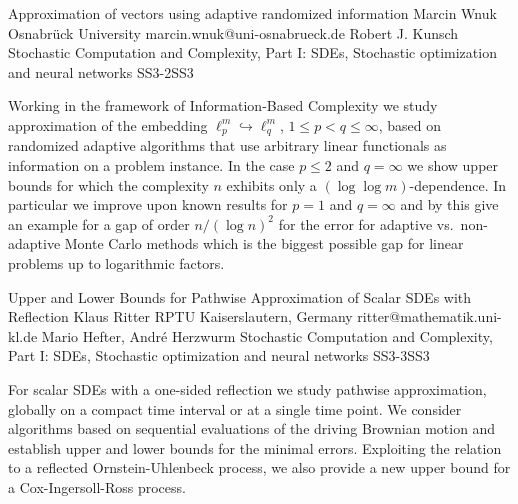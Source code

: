 \begin{talk}
{Approximation of vectors using adaptive randomized information}
{Marcin Wnuk}
{Osnabr\"uck University}
{marcin.wnuk@uni-osnabrueck.de}
{Robert J. Kunsch}
{Stochastic Computation and Complexity, Part I: SDEs, Stochastic optimization and neural networks}
{}{SS3-2}{SS3}



Working in the framework of Information-Based Complexity we study approximation of the embedding $\ell_p^m \hookrightarrow \ell_q^m$, $1 \leq p < q \leq \infty$,
based on randomized adaptive algorithms that use arbitrary linear 
functionals as information on a problem instance.
In the case $p \leq 2$ and $q = \infty$
we show upper bounds for which the complexity $n$ 
exhibits only a $(\log\log m)$-dependence. 
In particular we improve upon known results for $p=1$ and $q=\infty$
and by this give an example for a gap of order $n / (\log n)^2$
for the error for adaptive vs.\ non-adaptive Monte Carlo methods
which is the biggest possible gap for linear problems up to logarithmic factors.

\end{talk}

\begin{talk}
  {Upper and Lower Bounds for Pathwise Approximation of Scalar SDEs with Reflection}%
  {Klaus Ritter}%
  {RPTU Kaiserslautern, Germany}%
  {ritter@mathematik.uni-kl.de}%
  {Mario Hefter, Andr\'e Herzwurm}%
{Stochastic Computation and Complexity, Part I: SDEs, Stochastic optimization and neural networks}
{}{SS3-3}{SS3}


				
For scalar SDEs with a one-sided reflection we study 
pathwise approximation, globally on a compact time interval 
or at a single time point. We consider algorithms
based on sequential evaluations of the 
driving Brownian motion and establish
upper and lower bounds for the minimal
errors. Exploiting the relation to a reflected
Ornstein-Uhlenbeck process, we also provide
a new upper bound for a Cox-Ingersoll-Ross process.
\end{talk}

